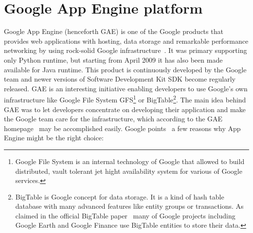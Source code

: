 \section{Google App Engine platform}\label{sec:gae_general}
Google App Engine (henceforth GAE) is one of the Google products that provides web applications with hosting, data storage and remarkable performance networking by using rock-solid Google infrastructure~\cite[page 1]{gae_develop}. It was primary supporting only Python runtime, but starting from April 2009 it has also been made available for Java runtime. This product is continuously developed by the Google team and newer versions of Software Development Kit SDK become regularly released. GAE is an interesting initiative enabling developers to use Google's own infrastructure like Google File System GFS\footnote{Google File System is an internal technology of Google that allowed to build distributed, vault tolerant jet hight availability system for various of Google services.} or BigTable\footnote{BigTable is Google concept for data storage. It is a kind of hash table database with many advanced features like entity groups or transactions. As claimed in the official BigTable paper~\cite{bigtable_about} many of Google projects including Google Earth and Google Finance use BigTable entities to store their data.}. The main idea behind GAE was to let developers concentrate on developing their application and make the Google team care for the infrastructure, which according to the GAE homepage~\cite{gae_homepage} may be accomplished easily. Google points~\cite{gae_why} a few reasons why App Engine might be the right choice: 
